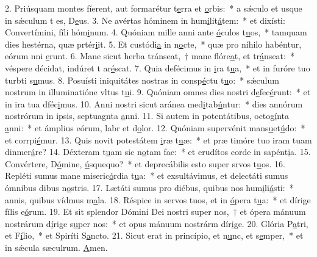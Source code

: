 2. Priúsquam montes fíerent, aut formarétur t\uline{e}rra et \uline{o}rbis:~* a sǽculo et usque in sǽculum t es, D\uline{e}us.
3. Ne avértas hóminem in hum\uline{i}lit\uline{á}tem:~* et dixísti: Convertímini, fíli hóm\uline{i}num.
4. Quóniam mille anni ante \uline{ó}culos t\uline{u}os,~* tamquam dies hestérna, quæ prtér\uline{i}it.
5. Et custódi\uline{a} in n\uline{o}cte,~* quæ pro níhilo habéntur, eórum nni \uline{e}runt.
6. Mane sicut herba tránseat,~† mane flóre\uline{a}t, et tr\uline{á}nseat:~* véspere décidat, indúret t ar\uline{é}scat.
7. Quia defécimus in \uline{i}ra t\uline{u}a,~* et in furóre tuo turbti s\uline{u}mus.
8. Posuísti iniquitátes nostras in consp\uline{é}ctu t\uline{u}o:~* sǽculum nostrum in illuminatióne vltus t\uline{u}i.
9. Quóniam omnes dies nostri d\uline{e}fec\uline{é}runt:~* et in ira tua dféc\uline{i}mus.
10. Anni nostri sicut aránea med\uline{i}tab\uline{ú}ntur:~* dies annórum nostrórum in ipsis, septuagnta \uline{a}nni.
11. Si autem in potentátibus, octog\uline{í}nta \uline{a}nni:~* et ámplius eórum, labr et d\uline{o}lor.
12. Quóniam supervénit mans\uline{u}et\uline{ú}do:~* et corrpi\uline{é}mur.
13. Quis novit potestátem \uline{i}ræ t\uline{u}æ:~* et præ timóre tuo iram tuam dinmer\uline{á}re?
14. Déxteram t\uline{u}am sic n\uline{o}tam fac:~* et erudítos corde in sapént\uline{i}a.
15. Convértere, D\uline{ó}mine, \uline{ú}squequo?~* et deprecábilis esto super srvos t\uline{u}os.
16. Repléti sumus mane miseric\uline{ó}rdia t\uline{u}a:~* et exsultávimus, et delectáti sumus ómnibus dibus n\uline{o}stris.
17. Lætáti sumus pro diébus, quibus nos hum\uline{i}li\uline{á}sti:~* annis, quibus vídmus m\uline{a}la.
18. Réspice in servos tuos, et in \uline{ó}pera t\uline{u}a:~* et dírige fílis e\uline{ó}rum.
19. Et sit splendor Dómini Dei nostri super nos,~† et ópera mánuum nostrárum d\uline{í}rige s\uline{u}per nos:~* et opus mánuum nostrárm dír\uline{i}ge.
20. Glória P\uline{a}tri, et F\uline{í}lio,~* et Spiríti S\uline{a}ncto.
21. Sicut erat in princípio, et n\uline{u}nc, et s\uline{e}mper,~* et in sǽcula sæculrum. \uline{A}men.
